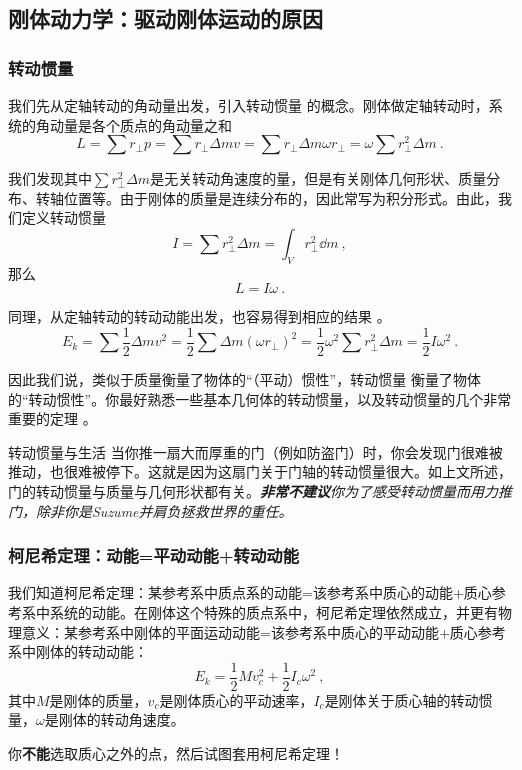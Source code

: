 \subsection{刚体动力学：驱动刚体运动的原因}
\subsubsection{转动惯量}
我们先从定轴转动的角动量出发，引入转动惯量 的概念。刚体做定轴转动时，系统的角动量是各个质点的角动量之和
$$L = \sum r_\perp p = \sum r_\perp \Delta m v = \sum r_\perp \Delta m \omega r_\perp = \omega \sum r_\perp^2 \Delta m~.$$

我们发现其中$\sum r_\perp^2 \Delta m$是无关转动角速度的量，但是有关刚体几何形状、质量分布、转轴位置等。由于刚体的质量是连续分布的，因此常写为积分形式。由此，我们定义转动惯量
$$
I =\sum r_\perp^2 \Delta m = \int_V r_\perp^2 \dd m~,
$$
那么
$$ L = I \omega~.$$

同理，从定轴转动的转动动能出发，也容易得到相应的结果 。
$$E_k = \sum \frac{1}{2} \Delta m v^2 = \frac{1}{2} \sum \Delta m (\omega r_\perp)^2 = \frac{1}{2} \omega^2 \sum r_\perp^2 \Delta m = \frac{1}{2} I \omega^2~.$$

因此我们说，类似于质量衡量了物体的“（平动）惯性”，转动惯量 衡量了物体的“转动惯性”。你最好熟悉一些基本几何体的转动惯量，以及转动惯量的几个非常重要的定理 。

\begin{example}{转动惯量与生活}
当你推一扇大而厚重的门（例如防盗门）时，你会发现门很难被推动，也很难被停下。这就是因为这扇门关于门轴的转动惯量很大。如上文所述，门的转动惯量与质量与几何形状都有关。\textsl{\textbf{非常不建议}你为了感受转动惯量而用力推门，除非你是Suzume并肩负拯救世界的重任。}
\end{example}

\subsubsection{柯尼希定理：动能=平动动能+转动动能}
我们知道柯尼希定理：某参考系中质点系的动能=该参考系中质心的动能+质心参考系中系统的动能。在刚体这个特殊的质点系中，柯尼希定理依然成立，并更有物理意义：某参考系中刚体的平面运动动能=该参考系中质心的平动动能+质心参考系中刚体的转动动能：
$$E_k = \frac{1}{2}Mv_c^2 + \frac{1}{2} I_c \omega^2~,$$
其中$M$是刚体的质量，$v_c$是刚体质心的平动速率，$I_c$是刚体关于质心轴的转动惯量，$\omega$是刚体的转动角速度。

你\textbf{不能}选取质心之外的点，然后试图套用柯尼希定理！

